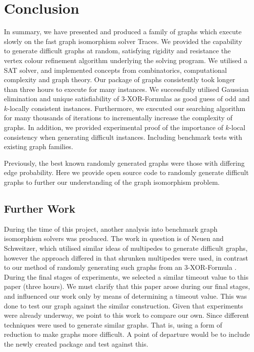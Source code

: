 \chapter{Conclusion}

\ifpdf
    \graphicspath{{Chapter3/Figs/Raster/}{Chapter3/Figs/PDF/}{Chapter3/Figs/}}
\else
    \graphicspath{{Chapter3/Figs/Vector/}{Chapter3/Figs/}}
\fi

In summary, we have presented and produced a family of graphs which execute slowly on the fast graph isomorphism solver Traces. We provided the capability to generate difficult graphs at random, satisfying  rigidity and resistance the vertex colour refinement algorithm underlying the solving program. We utilised a SAT solver, and implemented concepts from combinatorics, computational complexity and graph theory. Our package of graphs consistently took longer than three hours to execute for many instances. We successfully utilised Gaussian elimination and unique satisfiability of 3-XOR-Formulas as good guess of odd and $k$-locally consistent instances. Furthermore, we executed our searching algorithm for many thousands of iterations to incrementally increase the complexity of graphs. In addition, we provided experimental proof of the importance of $k$-local consistency when generating difficult instances. Including benchmark tests with existing graph families. 

Previously, the best known randomly generated graphs were those with differing edge probability. Here we provide open source code to randomly generate difficult graphs to further our understanding of the graph isomorphism problem.   

\section[Further Work]{Further Work}
During the time of this project, another analysis into benchmark graph isomorphism solvers was produced. The work in question is of Neuen and Schweitzer, which utilised similar ideas of multipedes to generate difficult graphs, however the approach differed in that shrunken multipedes were used, in contrast to our method of randomly generating such graphs from an 3-XOR-Formula \cite{neuen2017benchmark}. During the final stages of experiments, we selected a similar timeout value to this paper (three hours). We must clarify that this paper arose during our final stages, and influenced our work only by means of determining a timeout value. This was done to test our graph against the similar construction. Given that experiments were already underway, we point to this work to compare our own. Since different techniques were used to generate similar graphs. That is, using a form of reduction to make graphs more difficult. A point of departure would be to include the newly created package and test against this.

